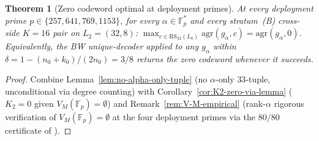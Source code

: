 \documentclass[11pt]{article}
\newtheorem{theorem}{Theorem}[section]
\theoremstyle{definition}
\theoremstyle{remark}
\newcommand{\FF}{\mathbb{F}}
\begin{document}
\begin{theorem}[Zero codeword optimal at deployment primes]
\label{thm:zero-codeword-optimal}
At every deployment prime $p \in \{257, 641, 769, 1153\}$, for every
$\alpha \in \FF_p^*$ and every stratum~(B) cross-side $K = 16$ pair on
$L_2 = (32, 8)$:
$\max_{c \in \mathrm{RS}_{32}(L_0)} \mathrm{agr}(g_\alpha, c)
= \mathrm{agr}(g_\alpha, 0)$.
Equivalently, the BW unique-decoder applied to any $g_\alpha$ within
$\delta = 1 - (n_0 + k_0)/(2 n_0) = 3/8$ returns the zero codeword whenever
it succeeds.
\end{theorem}

\begin{proof}
Combine Lemma~\ref{lem:no-alpha-only-tuple} (no $\alpha$-only $33$-tuple,
unconditional via degree counting) with Corollary~\ref{cor:K2-zero-via-lemma}
($K_2 = 0$ given $V_M(\mathbb{F}_p) = \emptyset$) and
Remark~\ref{rem:V-M-empirical} (rank-$\alpha$ rigorous verification of
$V_M(\mathbb{F}_p) = \emptyset$ at the four deployment primes via the
$80/80$ certificate of \cite{CompanionRepo}).
\end{proof}
\end{document}
